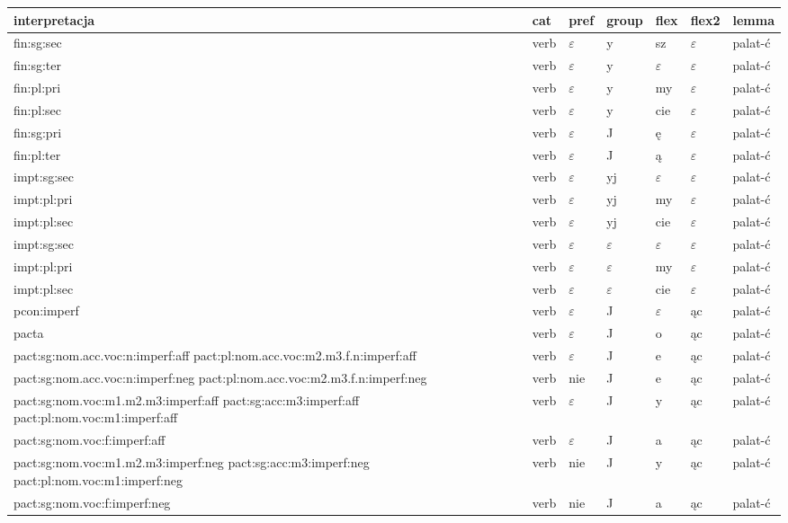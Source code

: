 \documentclass{article}
\begin{document}
\begin{longtable}{p{7cm}|l|l|l|l|l|l}
interpretacja & cat & pref & group & flex & flex2 & lemma\\
\hline
fin:sg:sec & verb & $\varepsilon$ & y & sz & $\varepsilon$ & palat-ć\\
fin:sg:ter & verb & $\varepsilon$ & y & $\varepsilon$ & $\varepsilon$ & palat-ć\\
fin:pl:pri & verb & $\varepsilon$ & y & my & $\varepsilon$ & palat-ć\\
fin:pl:sec & verb & $\varepsilon$ & y & cie & $\varepsilon$ & palat-ć\\
fin:sg:pri & verb & $\varepsilon$ & J & ę & $\varepsilon$ & palat-ć\\
fin:pl:ter & verb & $\varepsilon$ & J & ą & $\varepsilon$ & palat-ć\\
impt:sg:sec & verb & $\varepsilon$ & yj & $\varepsilon$ & $\varepsilon$ & palat-ć\\
impt:pl:pri & verb & $\varepsilon$ & yj & my & $\varepsilon$ & palat-ć\\
impt:pl:sec & verb & $\varepsilon$ & yj & cie & $\varepsilon$ & palat-ć\\
impt:sg:sec & verb & $\varepsilon$ & $\varepsilon$ & $\varepsilon$ & $\varepsilon$ & palat-ć\\
impt:pl:pri & verb & $\varepsilon$ & $\varepsilon$ & my & $\varepsilon$ & palat-ć\\
impt:pl:sec & verb & $\varepsilon$ & $\varepsilon$ & cie & $\varepsilon$ & palat-ć\\
pcon:imperf & verb & $\varepsilon$ & J & $\varepsilon$ & ąc & palat-ć\\
pacta & verb & $\varepsilon$ & J & o & ąc & palat-ć\\
pact:sg:nom.acc.voc:n:imperf:aff pact:pl:nom.acc.voc:m2.m3.f.n:imperf:aff & verb & $\varepsilon$ & J & e & ąc & palat-ć\\
pact:sg:nom.acc.voc:n:imperf:neg pact:pl:nom.acc.voc:m2.m3.f.n:imperf:neg & verb & nie & J & e & ąc & palat-ć\\
pact:sg:nom.voc:m1.m2.m3:imperf:aff pact:sg:acc:m3:imperf:aff pact:pl:nom.voc:m1:imperf:aff & verb & $\varepsilon$ & J & y & ąc & palat-ć\\
pact:sg:nom.voc:f:imperf:aff & verb & $\varepsilon$ & J & a & ąc & palat-ć\\
pact:sg:nom.voc:m1.m2.m3:imperf:neg pact:sg:acc:m3:imperf:neg pact:pl:nom.voc:m1:imperf:neg & verb & nie & J & y & ąc & palat-ć\\
pact:sg:nom.voc:f:imperf:neg & verb & nie & J & a & ąc & palat-ć\\

\end{longtable}
\end{document}
